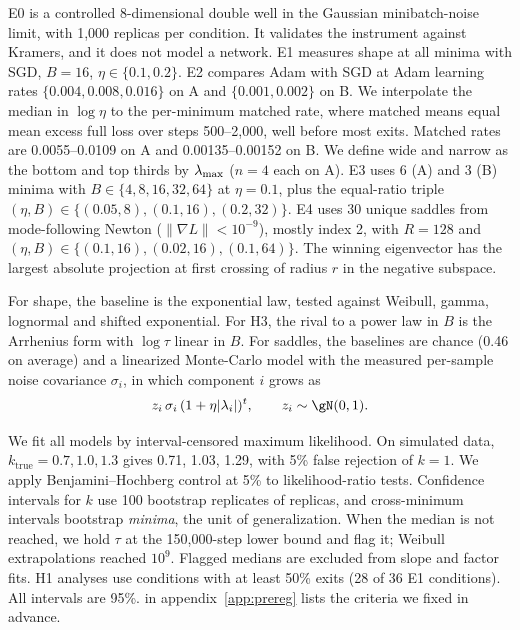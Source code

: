 E0 is a controlled 8-dimensional double well in the Gaussian minibatch-noise limit, with 1,000 replicas per condition.
It validates the instrument against Kramers, and it does not model a network.
E1 measures shape at all minima with SGD, $B=16$, $\eta\in\{0.1,0.2\}$.
E2 compares Adam with SGD at Adam learning rates $\{0.004,0.008,0.016\}$ on A and $\{0.001,0.002\}$ on B.
We interpolate the median in $\log\eta$ to the per-minimum matched rate, where matched means equal mean excess full loss over steps 500--2,000, well before most exits.
Matched rates are 0.0055--0.0109 on A and 0.00135--0.00152 on B.
We define wide and narrow as the bottom and top thirds by $\lambda_{\max}$ ($n=4$ each on A).
E3 uses 6 (A) and 3 (B) minima with $B\in\{4,8,16,32,64\}$ at $\eta=0.1$, plus the equal-ratio triple $(\eta,B)\in\{(0.05,8),(0.1,16),(0.2,32)\}$.
E4 uses 30 unique saddles from mode-following Newton ($\|\nabla L\|<10^{-9}$), mostly index 2, with $R=128$ and $(\eta,B)\in\{(0.1,16),(0.02,16),(0.1,64)\}$.
The winning eigenvector has the largest absolute projection at first crossing of radius $r$ in the negative subspace.

For shape, the baseline is the exponential law, tested against Weibull, gamma, lognormal and shifted exponential.
For H3, the rival to a power law in $B$ is the Arrhenius form with $\log\tau$ linear in $B$.
For saddles, the baselines are chance (0.46 on average) and a linearized Monte-Carlo model with the measured per-sample noise covariance $\sigma_i$, in which component $i$ grows as
\begin{equation}
    z_i\,\sigma_i\,(1+\eta|\lambda_i|)^{t},\qquad z_i\sim\gN(0,1).
    \label{eq:linear}
\end{equation}

We fit all models by interval-censored maximum likelihood.
On simulated data, $k_{\text{true}}=0.7,1.0,1.3$ gives 0.71, 1.03, 1.29, with 5\% false rejection of $k=1$.
We apply Benjamini--Hochberg control at 5\% to likelihood-ratio tests.
Confidence intervals for $k$ use 100 bootstrap replicates of replicas, and cross-minimum intervals bootstrap {\em minima}, the unit of generalization.
When the median is not reached, we hold $\tau$ at the 150,000-step lower bound and flag it; Weibull extrapolations reached $10^{9}$.
Flagged medians are excluded from slope and factor fits.
H1 analyses use conditions with at least 50\% exits (28 of 36 E1 conditions).
All intervals are 95\%.
 in appendix~\ref{app:prereg} lists the criteria we fixed in advance.
